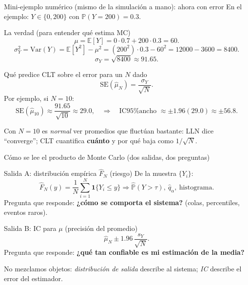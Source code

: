 \documentclass[aspectratio=1610, 9pt]{beamer}
\begin{document}
\begin{frame}{Mini-ejemplo numérico (mismo de la simulación a mano): ahora con error}
En el ejemplo: $Y\in\{0,200\}$ con $\mathbb P(Y=200)=0.3$.

\begin{block}{La verdad (para entender qué estima MC)}
\[
\mu=\mathbb E[Y]=0\cdot 0.7 + 200\cdot 0.3=60.
\]
\[
\sigma_Y^2=\mathrm{Var}(Y)=\mathbb E[Y^2]-\mu^2
= (200^2)\cdot 0.3 - 60^2 = 12000 - 3600 = 8400.
\]
\[
\sigma_Y=\sqrt{8400}\approx 91.65.
\]
\end{block}

\begin{block}{Qué predice CLT sobre el error para un $N$ dado}
\[
\mathrm{SE}(\widehat\mu_N)=\frac{\sigma_Y}{\sqrt{N}}.
\]
Por ejemplo, si $N=10$:
\[
\mathrm{SE}(\widehat\mu_{10})\approx \frac{91.65}{\sqrt{10}}\approx 29.0,
\quad \Rightarrow \quad
\text{IC95\% ancho } \approx \pm 1.96(29.0)\approx \pm 56.8.
\]
\end{block}

Con $N=10$ es \emph{normal} ver promedios que fluctúan bastante: LLN dice ``converge'';
CLT cuantifica \textbf{cuánto} y por qué baja como $1/\sqrt{N}$.

\end{frame}

\begin{frame}{Cómo se lee el producto de Monte Carlo (dos salidas, dos preguntas)}
\begin{block}{Salida A: distribución empírica $\widehat F_N$ (riesgo)}
De la muestra $\{Y_i\}$:
\[
\widehat F_N(y)=\frac{1}{N}\sum_{i=1}^N \mathbf 1\{Y_i\le y\}
\Rightarrow
\widehat{\mathbb P}(Y>\tau),\ \widehat q_\alpha,\ \text{histograma}.
\]
Pregunta que responde: \textbf{¿cómo se comporta el sistema?} (colas, percentiles, eventos raros).
\end{block}

\begin{block}{Salida B: IC para $\mu$ (precisión del promedio)}
\[
\widehat\mu_N \pm 1.96\,\frac{s_Y}{\sqrt{N}}.
\]
Pregunta que responde: \textbf{¿qué tan confiable es mi estimación de la media?}
\end{block}


No mezclamos objetos: \emph{distribución de salida} describe al sistema; \emph{IC} describe el error del estimador.

\end{frame}
\end{document}
